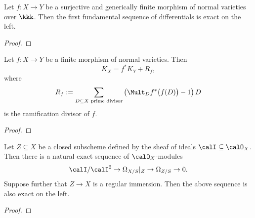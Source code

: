     \begin{proposition}\label{prop:the_first_fundamental_sequence_exact_when}
        Let \(f: X \to Y\) be a surjective and generically finite morphism of normal varieties over \(\kkk\).
        Then the first fundamental sequence of differentials is exact on the left.
    \end{proposition}
    \begin{proof}
    \end{proof}
    
    \begin{corollary}\label{cor:ramification_formula}
        Let \(f: X \to Y\) be a finite morphism of normal varieties. 
        Then 
        \[
            K_X = f^*K_Y + R_f,
        \]
        where 
        \[ R_f := \sum_{D \subseteq X \text{ prime divisor}} \left( \Mult_D f^*\big(f(D)\big)-1 \right) D \]
        is the ramification divisor of \(f\).
    \end{corollary}
    \begin{proof}
    \end{proof}


    \begin{theorem}\label{thm:the_second_fundamental_sequence_of_differentials}
        Let \(Z \subseteq X\) be a closed subscheme defined by the sheaf of ideals \(\calI \subseteq \calO_X\).
        Then there is a natural exact sequence of \(\calO_X\)-modules
        \[
            \calI/\calI^2 \to \Omega_{X/S}|_Z \to \Omega_{Z/S} \to 0.
        \]
        Suppose further that \(Z \to X\) is a regular immersion.
        Then the above sequence is also exact on the left.
    \end{theorem}
    \begin{proof}
    \end{proof}
    
